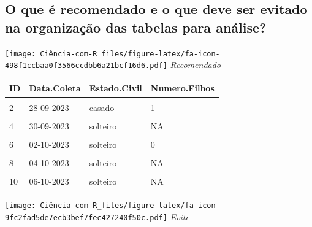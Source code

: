 \documentclass[
]{book}
\begin{document}
\hypertarget{o-que-uxe9-recomendado-e-o-que-deve-ser-evitado-na-organizauxe7uxe3o-das-tabelas-para-anuxe1lise}{%
\subsection{O que é recomendado e o que deve ser evitado na organização das tabelas para análise?}\label{o-que-uxe9-recomendado-e-o-que-deve-ser-evitado-na-organizauxe7uxe3o-das-tabelas-para-anuxe1lise}}

\texttt{[image: Ciência-com-R\_files/figure-latex/fa-icon-498f1ccbaa0f3566ccdbb6a21bcf16d6.pdf]} \emph{Recomendado}

\begin{tabu} to 
\toprule
\textbf{ID} & \textbf{Data.Coleta} & \textbf{Estado.Civil} & \textbf{Numero.Filhos}\\
\midrule
{} &  &  & \\
2 & 28-09-2023 & casado & 1\\
 &  &  & \\
4 & 30-09-2023 & solteiro & NA\\
 &  &  & \\
6 & 02-10-2023 & solteiro & 0\\
 &  &  & \\
8 & 04-10-2023 & solteiro & NA\\
 &  &  & \\
10 & 06-10-2023 & solteiro & NA\\
\bottomrule
\end{tabu}

\texttt{[image: Ciência-com-R\_files/figure-latex/fa-icon-9fc2fad5de7ecb3bef7fec427240f50c.pdf]} \emph{Evite}
\end{document}
